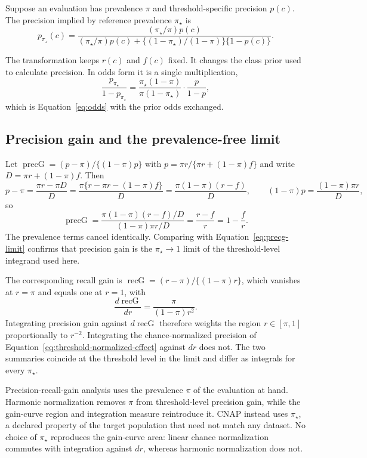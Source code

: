 \documentclass[11pt]{article}
\theoremstyle{remark}
\begin{document}
Suppose an evaluation has prevalence $\pi$ and threshold-specific precision $p(c)$. The precision implied by reference prevalence $\pi_\star$ is
\begin{equation}
p_{\pi_\star}(c)
=
\frac{(\pi_\star/\pi)p(c)}
{(\pi_\star/\pi)p(c)
+
\{(1-\pi_\star)/(1-\pi)\}\{1-p(c)\}}.
\label{eq:precision-transform}
\end{equation}

The transformation keeps $r(c)$ and $f(c)$ fixed. It changes the class prior used to calculate precision. In odds form it is a single multiplication,
\[
\frac{p_{\pi_\star}}{1-p_{\pi_\star}}
=
\frac{\pi_\star(1-\pi)}{\pi(1-\pi_\star)}
\cdot
\frac{p}{1-p},
\]
which is Equation~\eqref{eq:odds} with the prior odds exchanged.

\subsection{Precision gain and the prevalence-free limit}
\label{app:precg}

Let $\operatorname{precG}=(p-\pi)/\{(1-\pi)p\}$ with $p=\pi r/\{\pi r+(1-\pi)f\}$ and write $D=\pi r+(1-\pi)f$. Then
\[
p-\pi
=
\frac{\pi r-\pi D}{D}
=
\frac{\pi\{r-\pi r-(1-\pi)f\}}{D}
=
\frac{\pi(1-\pi)(r-f)}{D},
\qquad
(1-\pi)p
=
\frac{(1-\pi)\pi r}{D},
\]
so
\[
\operatorname{precG}
=
\frac{\pi(1-\pi)(r-f)/D}{(1-\pi)\pi r/D}
=
\frac{r-f}{r}
=
1-\frac{f}{r}.
\]
The prevalence terms cancel identically. Comparing with Equation~\eqref{eq:precg-limit} confirms that precision gain is the $\pi_\star\to1$ limit of the threshold-level integrand used here.

The corresponding recall gain is $\operatorname{recG}=(r-\pi)/\{(1-\pi)r\}$, which vanishes at $r=\pi$ and equals one at $r=1$, with
\[
\frac{d\operatorname{recG}}{dr}
=
\frac{\pi}{(1-\pi)r^{2}} .
\]
Integrating precision gain against $d\operatorname{recG}$ therefore weights the region $r\in[\pi,1]$ proportionally to $r^{-2}$. Integrating the chance-normalized precision of Equation~\eqref{eq:threshold-normalized-effect} against $dr$ does not. The two summaries coincide at the threshold level in the limit and differ as integrals for every $\pi_\star$.

Precision-recall-gain analysis uses the prevalence $\pi$ of the evaluation at hand. Harmonic normalization removes $\pi$ from threshold-level precision gain, while the gain-curve region and integration measure reintroduce it. CNAP instead uses $\pi_\star$, a declared property of the target population that need not match any dataset. No choice of $\pi_\star$ reproduces the gain-curve area: linear chance normalization commutes with integration against $dr$, whereas harmonic normalization does not.
\end{document}
